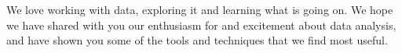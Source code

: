 \documentclass[oneside]{article}
\begin{document}
We love working with data, exploring it and learning what is going on.  We hope we have shared with you our enthusiasm for and excitement about data analysis, and have shown you some of the tools and techniques that we find most useful.  








\end{document}
